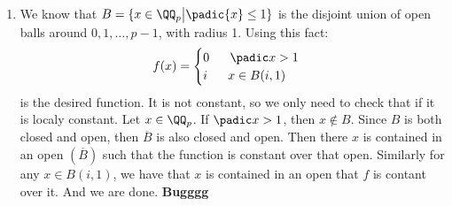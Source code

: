\begin{enumerate}[label=]
    \item 
        We know that $B = \{x \in \QQ_p \big| \padic{x} \le 1 \}$ is the disjoint union of open balls around $0, 1, \dots, p - 1$, with radius 1. Using this fact:
        \begin{gather*}
            f(x) = \begin{cases}
                0 \ \ \ \ \ \padic x > 1 \\
                i \ \ \ \ \ x \in B(i, 1)
            \end{cases}
        \end{gather*}
        is the desired function. It is not constant, so we only need to check that if it is localy constant.
        Let $x \in \QQ_p$. If $\padic x > 1$, then $x \notin B$. Since $B$ is both closed and open, then $\overline{B}$ is also closed and open. Then there $x$ is contained in an open $(\overline{B})$ such that the function is constant over that open. Similarly for any $x \in B(i, 1)$, we have that $x$ is contained in an open that $f$ is contant over it. And we are done. \textbf{Bugggg}
\end{enumerate}